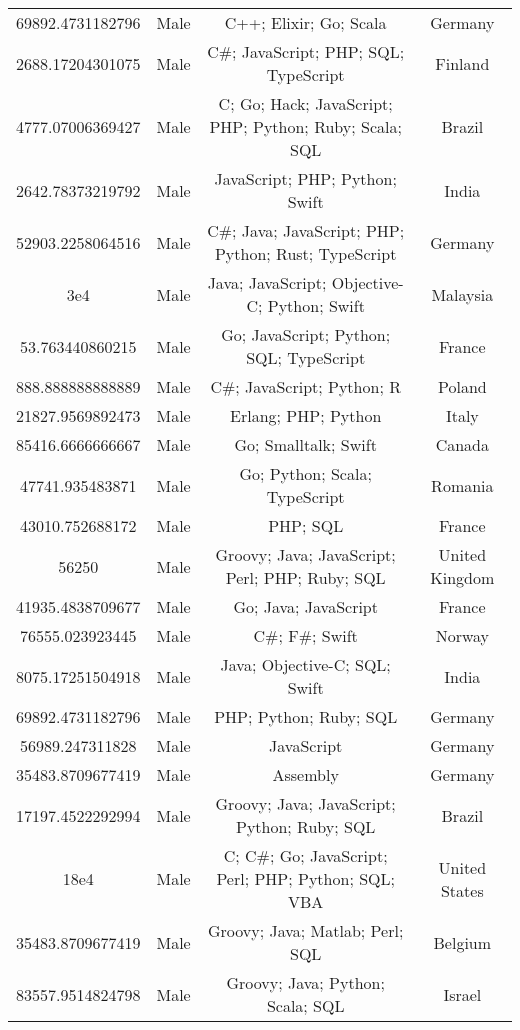 \begin{center}
\begin{tabular}{ |c|c|c|c| }
69892.4731182796  &  Male  &  C++; Elixir; Go; Scala  &  Germany  \\ 
2688.17204301075  &  Male  &  C\#; JavaScript; PHP; SQL; TypeScript  &  Finland  \\ 
4777.07006369427  &  Male  &  C; Go; Hack; JavaScript; PHP; Python; Ruby; Scala; SQL  &  Brazil  \\ 
2642.78373219792  &  Male  &  JavaScript; PHP; Python; Swift  &  India  \\ 
52903.2258064516  &  Male  &  C\#; Java; JavaScript; PHP; Python; Rust; TypeScript  &  Germany  \\ 
3e4  &  Male  &  Java; JavaScript; Objective-C; Python; Swift  &  Malaysia  \\ 
53.763440860215  &  Male  &  Go; JavaScript; Python; SQL; TypeScript  &  France  \\ 
888.888888888889  &  Male  &  C\#; JavaScript; Python; R  &  Poland  \\ 
21827.9569892473  &  Male  &  Erlang; PHP; Python  &  Italy  \\ 
85416.6666666667  &  Male  &  Go; Smalltalk; Swift  &  Canada  \\ 
47741.935483871  &  Male  &  Go; Python; Scala; TypeScript  &  Romania  \\ 
43010.752688172  &  Male  &  PHP; SQL  &  France  \\ 
56250  &  Male  &  Groovy; Java; JavaScript; Perl; PHP; Ruby; SQL  &  United Kingdom  \\ 
41935.4838709677  &  Male  &  Go; Java; JavaScript  &  France  \\ 
76555.023923445  &  Male  &  C\#; F\#; Swift  &  Norway  \\ 
8075.17251504918  &  Male  &  Java; Objective-C; SQL; Swift  &  India  \\ 
69892.4731182796  &  Male  &  PHP; Python; Ruby; SQL  &  Germany  \\ 
56989.247311828  &  Male  &  JavaScript  &  Germany  \\ 
35483.8709677419  &  Male  &  Assembly  &  Germany  \\ 
17197.4522292994  &  Male  &  Groovy; Java; JavaScript; Python; Ruby; SQL  &  Brazil  \\ 
18e4  &  Male  &  C; C\#; Go; JavaScript; Perl; PHP; Python; SQL; VBA  &  United States  \\ 
35483.8709677419  &  Male  &  Groovy; Java; Matlab; Perl; SQL  &  Belgium  \\ 
83557.9514824798  &  Male  &  Groovy; Java; Python; Scala; SQL  &  Israel  \\ 

\end{tabular}
\end{center}
